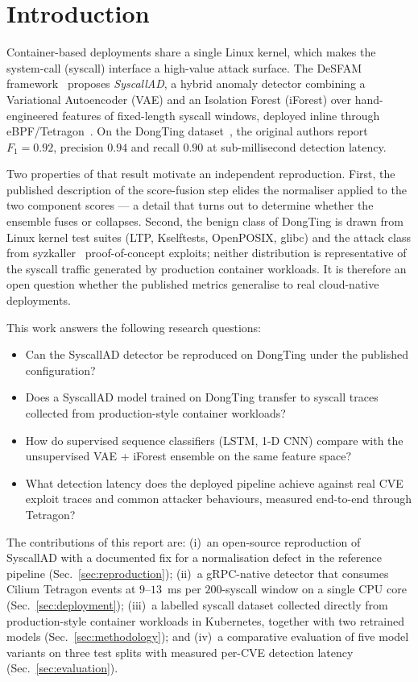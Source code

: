 \section{Introduction}
\label{sec:intro}

Container-based deployments share a single Linux kernel, which makes
the system-call (syscall) interface a high-value attack surface. The
DeSFAM framework~\cite{desfam2025} proposes \emph{SyscallAD}, a hybrid
anomaly detector combining a Variational Autoencoder (VAE) and an
Isolation Forest (iForest) over hand-engineered features of fixed-length
syscall windows, deployed inline through eBPF/Tetragon~\cite{tetragon}.
On the DongTing dataset~\cite{dongting}, the original authors report
$F_{1}=0.92$, precision $0.94$ and recall $0.90$ at sub-millisecond
detection latency.

Two properties of that result motivate an independent reproduction.
First, the published description of the score-fusion step elides the
normaliser applied to the two component scores --- a detail that turns
out to determine whether the ensemble fuses or collapses. Second, the
benign class of DongTing is drawn from Linux kernel test suites
(LTP, Kselftests, OpenPOSIX, glibc) and the attack class from
syzkaller~\cite{syzkaller} proof-of-concept exploits; neither
distribution is representative of the syscall traffic generated by
production container workloads. It is therefore an open question
whether the published metrics generalise to real cloud-native
deployments.

This work answers the following research questions:
\begin{itemize}
  \item[\textbf{RQ1.}] Can the SyscallAD detector be reproduced on
        DongTing under the published configuration?
  \item[\textbf{RQ2.}] Does a SyscallAD model trained on DongTing
        transfer to syscall traces collected from production-style
        container workloads?
  \item[\textbf{RQ3.}] How do supervised sequence classifiers
        (LSTM, 1-D CNN) compare with the unsupervised VAE + iForest
        ensemble on the same feature space?
  \item[\textbf{RQ4.}] What detection latency does the deployed
        pipeline achieve against real CVE exploit traces and common
        attacker behaviours, measured end-to-end through Tetragon?
\end{itemize}

The contributions of this report are: (i)~an open-source reproduction
of SyscallAD with a documented fix for a normalisation defect in the
reference pipeline (Sec.~\ref{sec:reproduction}); (ii)~a gRPC-native
detector that consumes Cilium Tetragon events at $9$--$13$~ms per
$200$-syscall window on a single CPU core (Sec.~\ref{sec:deployment});
(iii)~a labelled syscall dataset collected directly from
production-style container workloads in Kubernetes, together with two
retrained models (Sec.~\ref{sec:methodology}); and (iv)~a comparative
evaluation of five model variants on three test splits with measured
per-CVE detection latency (Sec.~\ref{sec:evaluation}).

